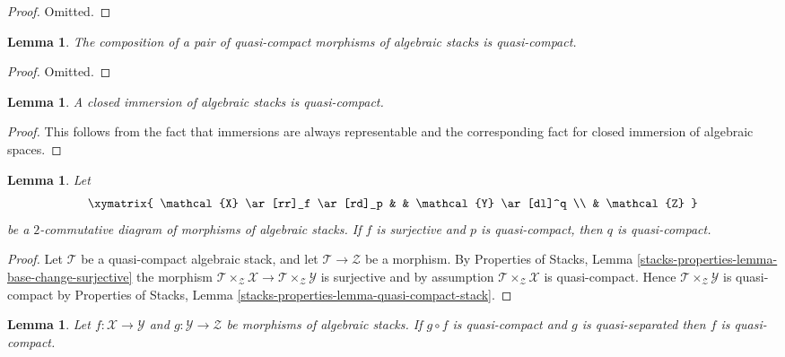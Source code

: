 \documentclass{stacks-project}
\theoremstyle{plain}
\newtheorem{lemma}[subsection]{Lemma}
\theoremstyle{definition}
\theoremstyle{remark}
\numberwithin{equation}{subsection}
\begin{document}
\begin{proof}
Omitted.
\end{proof}

\begin{lemma}
\label{lemma-composition-quasi-compact}
The composition of a pair of quasi-compact morphisms of algebraic stacks
is quasi-compact.
\end{lemma}

\begin{proof}
Omitted.
\end{proof}

\begin{lemma}
\label{lemma-closed-immersion-quasi-compact}
A closed immersion of algebraic stacks is quasi-compact.
\end{lemma}

\begin{proof}
This follows from the fact that immersions are always representable and
the corresponding fact for closed immersion of algebraic spaces.
\end{proof}

\begin{lemma}
\label{lemma-surjection-from-quasi-compact}
Let
$$
\xymatrix{
\mathcal{X} \ar[rr]_f \ar[rd]_p & &
\mathcal{Y} \ar[dl]^q \\
& \mathcal{Z}
}
$$
be a $2$-commutative diagram of morphisms of algebraic stacks.
If $f$ is surjective and $p$ is quasi-compact, then $q$ is quasi-compact.
\end{lemma}

\begin{proof}
Let $\mathcal{T}$ be a quasi-compact algebraic stack, and let
$\mathcal{T} \to \mathcal{Z}$ be a morphism. By
Properties of Stacks,
Lemma \ref{stacks-properties-lemma-base-change-surjective}
the morphism
$\mathcal{T} \times_\mathcal{Z} \mathcal{X} \to
\mathcal{T} \times_\mathcal{Z} \mathcal{Y}$
is surjective and by assumption
$\mathcal{T} \times_\mathcal{Z} \mathcal{X}$
is quasi-compact. Hence
$\mathcal{T} \times_\mathcal{Z} \mathcal{Y}$
is quasi-compact by
Properties of Stacks, Lemma \ref{stacks-properties-lemma-quasi-compact-stack}.
\end{proof}

\begin{lemma}
\label{lemma-quasi-compact-permanence}
Let $f : \mathcal{X} \to \mathcal{Y}$ and
$g : \mathcal{Y} \to \mathcal{Z}$ be morphisms of algebraic stacks.
If $g \circ f$ is quasi-compact and $g$ is quasi-separated
then $f$ is quasi-compact.
\end{lemma}
\end{document}
